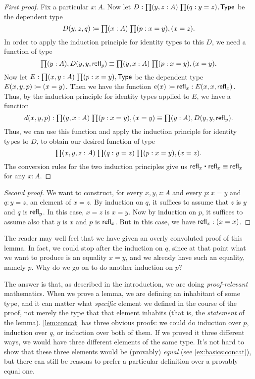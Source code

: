 \begin{proof}[First proof]
  Fix a particular $x:A$.
  Now let $D:\prd{y,z:A}{q:y=z} \type$ be the dependent type
  \begin{equation*}
    D(y,z,q)\defeq \prd{x:A}{p:x=y} (x=z).
  \end{equation*}
  In order to apply the induction principle for identity types to this $D$, we need a function of type
  \begin{equation*}
    \prd{y:A} D(y,y,\refl{y})
    \jdeq \prd{y,x:A}{p:x=y} (x=y).
  \end{equation*}
  Now let $E:\prd{x,y:A}{p:x=y}\type$ be the dependent type $E(x,y,p)\coloneqq (x=y)$.
  Then we have the function $e(x) \coloneqq \mathsf{refl}_{x} : E(x,x,\mathsf{refl}_{x})$.
  Thus, by the induction principle for identity types applied to $E$, we have a function
  \begin{equation*}
    d(x,y,p) : \prd{y,x:A}{p:x=y} (x=y) \jdeq \prd{y:A} D(y,y,\refl{y}).
  \end{equation*}
  Thus, we can use this function and apply the induction principle for identity types to $D$, to obtain our desired function of type
  \begin{equation*}
    \prd{x,y,z:A}{q:y=z}{p:x=y} (x=z).
  \end{equation*}
  The conversion rules for the two induction principles give us $\refl{x}\ct \refl{x}\jdeq \refl{x}$ for any $x:A$.
\end{proof}

\begin{proof}[Second proof]
  We want to construct, for every $x,y,z:A$ and every $p:x=y$ and $q:y=z$, an element of $x=z$.
  By induction on $q$, it suffices to assume that $z$ is $y$ and $q$ is $\mathsf{refl}_{y}$.
  In this case, $x=z$ is $x=y$.
  Now by induction on $p$, it suffices to assume also that $y$ is $x$ and $p$ is $\mathsf{refl}_{x}$.
  But in this case, we have $\mathsf{refl}_{x}:(x=x)$.
\end{proof}

The reader may well feel that we have given an overly convoluted proof of this lemma.
In fact, we could stop after the induction on $q$, since at that point what we want to produce is an equality $x=y$, and we already have such an equality, namely $p$.
Why do we go on to do another induction on $p$?

The answer is that, as described in the introduction, we are doing \emph{proof-relevant} mathematics.
When we prove a lemma, we are defining an inhabitant of some type, and it can matter what \emph{specific} element we defined in the course of the proof, not merely the type that that element inhabits (that is, the \emph{statement} of the lemma).
\autoref{lem:concat} has three obvious proofs: we could do induction over $p$, induction over $q$, or induction over both of them.
If we proved it three different ways, we would have three different elements of the same type.
It's not hard to show that these three elements would be (provably) \emph{equal} (see \autoref{ex:basics:concat}), but there can still be reasons to prefer a particular definition over a provably equal one.

